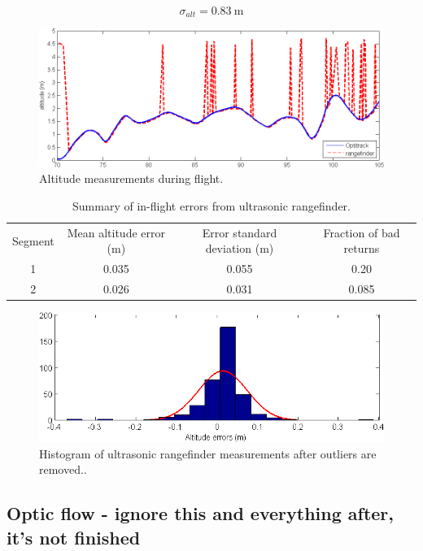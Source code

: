 \documentclass{article}
\begin{document}
\begin{equation}
\sigma_{alt} = 0.83 \ \mathrm{m}
\end{equation}

\begin{figure}[tb!]
\centering
\includegraphics[width=\textwidth]{../moving_flying_alt.png}
\caption{Altitude measurements during flight.}
\label{fig:movingflyingalt}
\end{figure}

\begin{table}
\centering
\begin{tabular}{c|c|c|c}
Segment & Mean altitude error (m) & Error standard deviation (m)& Fraction of bad returns\\
1 & 0.035 & 0.055 & 0.20\\
2 & 0.026 & 0.031 & 0.085\\
\end{tabular}
\caption{Summary of in-flight errors from ultrasonic rangefinder.}
\label{tab:altErrs}
\end{table}

\begin{figure}[tb!]
\centering
\includegraphics[width=\textwidth]{../moving_flying_alt_hist.png}
\caption{Histogram of ultrasonic rangefinder measurements after outliers are removed..}
\label{fig:movingflyingalthist}
\end{figure}

\subsection{Optic flow - ignore this and everything after, it's not finished}
\end{document}
